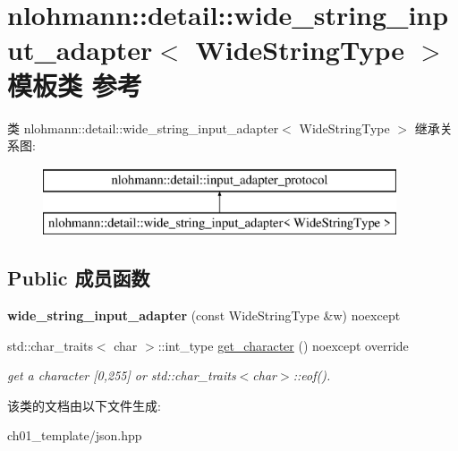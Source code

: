 \hypertarget{classnlohmann_1_1detail_1_1wide__string__input__adapter}{}\section{nlohmann\+::detail\+::wide\+\_\+string\+\_\+input\+\_\+adapter$<$ Wide\+String\+Type $>$ 模板类 参考}
\label{classnlohmann_1_1detail_1_1wide__string__input__adapter}
类 nlohmann\+::detail\+::wide\+\_\+string\+\_\+input\+\_\+adapter$<$ Wide\+String\+Type $>$ 继承关系图\+:\begin{figure}[H]
\begin{center}
\leavevmode
\includegraphics[height=2.000000cm]{classnlohmann_1_1detail_1_1wide__string__input__adapter}
\end{center}
\end{figure}
\subsection*{Public 成员函数}
\begin{DoxyCompactItemize}
\item 
\mbox{\label{classnlohmann_1_1detail_1_1wide__string__input__adapter_a85c8bddae20bc00d64dd7a2c87109357}} 
{\bfseries wide\+\_\+string\+\_\+input\+\_\+adapter} (const Wide\+String\+Type \&w) noexcept
\item 
\mbox{\label{classnlohmann_1_1detail_1_1wide__string__input__adapter_abb62b34cf77e557ce5321b7f2490c3b0}} 
std\+::char\+\_\+traits$<$ char $>$\+::int\+\_\+type \mbox{\hyperlink{classnlohmann_1_1detail_1_1wide__string__input__adapter_abb62b34cf77e557ce5321b7f2490c3b0}{get\+\_\+character}} () noexcept override
\begin{DoxyCompactList}\small\item\em get a character \mbox{[}0,255\mbox{]} or std\+::char\+\_\+traits$<$char$>$\+::eof(). \end{DoxyCompactList}\end{DoxyCompactItemize}


该类的文档由以下文件生成\+:\begin{DoxyCompactItemize}
\item 
ch01\+\_\+template/json.\+hpp\end{DoxyCompactItemize}

